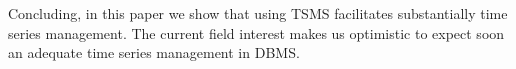 

Concluding, in this paper we show that using TSMS facilitates
substantially time series management. The current field interest makes
us optimistic to expect soon an adequate time series management in
DBMS.











